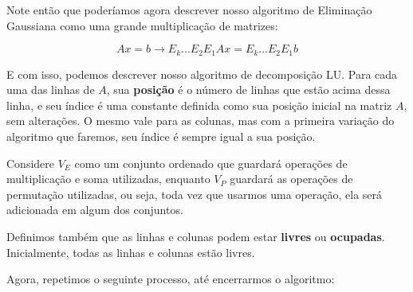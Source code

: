 \documentclass[11pt, a4paper]{article}
\begin{document}
Note então que poderíamos agora descrever nosso algoritmo de Eliminação Gaussiana como uma grande multiplicação de matrizes:

\void[-1.5]

\[Ax=b \rightarrow E_k...E_2E_1Ax=E_k...E_2E_1b\]

\void[-0.6]

E com isso, podemos descrever nosso algoritmo de decomposição LU. Para cada uma das linhas de \(A\), sua \textbf{posição} é o número de linhas que estão acima dessa linha, e seu índice é uma constante definida como sua posição inicial na matriz \(A\), sem alterações. O mesmo vale para as colunas, mas com a primeira variação do algoritmo que faremos, seu índice é sempre igual a sua posição.

Considere \(V_E\) como um conjunto ordenado que guardará operações de multiplicação e soma utilizadas, enquanto \(V_P\) guardará as operações de permutação utilizadas, ou seja, toda vez que usarmos uma operação, ela será adicionada em algum dos conjuntos. 

Definimos também que as linhas e colunas podem estar \textbf{livres} ou \textbf{ocupadas}. Inicialmente, todas as linhas e colunas estão livres.

Agora, repetimos o seguinte processo, até encerrarmos o algoritmo:
\end{document}
